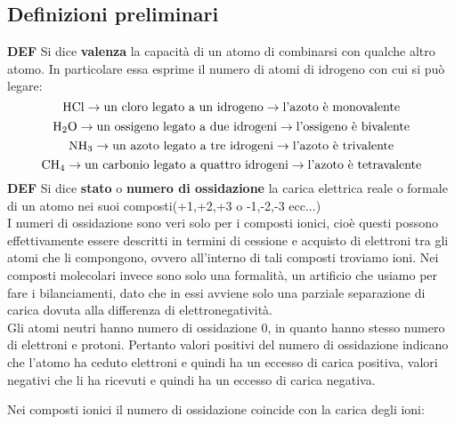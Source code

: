 \subsection{Definizioni preliminari}
\textbf{DEF} Si dice \textbf{valenza} la capacità di un atomo di combinarsi con qualche altro atomo. In particolare essa esprime il numero di atomi di idrogeno con cui si può legare:
$$\ce{HCl} \rightarrow \text{un cloro legato a un idrogeno} \rightarrow \text{l'azoto è monovalente}$$
$$\ce{H_2O} \rightarrow \text{un ossigeno legato a due idrogeni} \rightarrow \text{l'ossigeno è bivalente}$$
$$\ce{NH_3} \rightarrow \text{un azoto legato a tre idrogeni} \rightarrow \text{l'azoto è trivalente}$$
$$\ce{CH_4} \rightarrow \text{un carbonio legato a quattro idrogeni} \rightarrow \text{l'azoto è tetravalente}$$
\textbf{DEF} Si dice \textbf{stato} o \textbf{numero di ossidazione} la carica elettrica reale o formale di un atomo nei suoi composti(+1,+2,+3 o -1,-2,-3 ecc...)\\

I numeri di ossidazione sono veri solo per i composti ionici, cioè questi possono effettivamente essere descritti in termini di cessione e acquisto di elettroni tra gli atomi che li compongono, ovvero all'interno di tali composti troviamo ioni. Nei composti molecolari invece sono solo una formalità, un artificio che usiamo per fare i bilanciamenti, dato che in essi avviene solo una parziale separazione di carica dovuta alla differenza di elettronegatività.\\

Gli atomi neutri hanno numero di ossidazione 0, in quanto hanno stesso numero di elettroni e protoni. Pertanto valori positivi del numero di ossidazione indicano che l'atomo ha ceduto elettroni e quindi ha un eccesso di carica positiva, valori negativi che li ha ricevuti e quindi ha un eccesso di carica negativa.


Nei composti ionici il numero di ossidazione coincide con la carica degli ioni:


